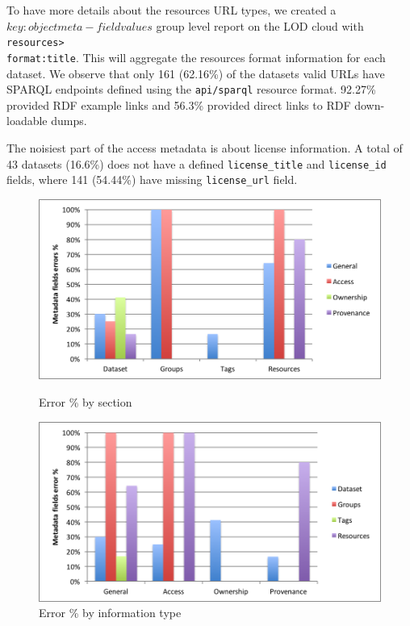 \documentclass[runningheads,a4paper]{../../Tools/LaTEX/llncs}
\begin{document}
To have more details about the resources URL types, we created a $key:object meta-field values$ group level report on the LOD cloud with \texttt{resources>\\format:title}. This will aggregate the resources format information for each dataset. We observe that only 161 (62.16\%) of the datasets valid URLs have SPARQL endpoints defined using the \texttt{api/sparql} resource format. 92.27\% provided RDF example links and 56.3\% provided direct links to RDF down-loadable dumps.

The noisiest part of the access metadata is about license information. A total of 43 datasets (16.6\%) does not have a defined \texttt{license\_title} and \texttt{license\_id} fields, where 141 (54.44\%) have missing \texttt{license\_url} field.

\begin{figure}
\parbox{7cm}{\hspace*{-.2in}
\includegraphics[width=.95\linewidth]{metadata_noise_by_section.png}
\captionsetup{textfont=small,singlelinecheck=off,justification=centering}
\caption{Error \% by section}
\label{fig:metadata_noise_by_section}}
\qquad
\begin{minipage}{7cm}\hspace*{-.6in}
\includegraphics[width=.95\linewidth]{metadata_noise_by_metadata_type.png}
\captionsetup{textfont=small,singlelinecheck=off,justification=raggedright}
\caption{Error \% by information type}
\label{fig:metadata_noise_by_metadata_type}
\end{minipage}
\end{figure}
\end{document}
